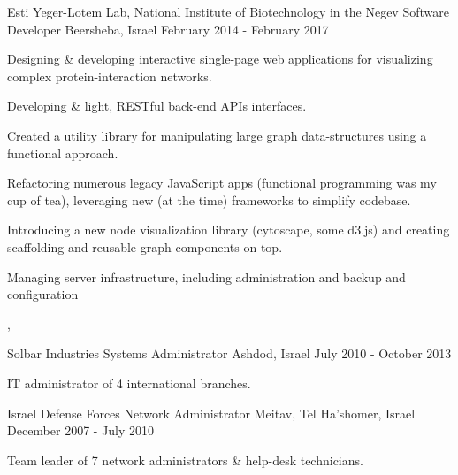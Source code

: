 \begin{cventries}
  \cventry
    {Esti Yeger-Lotem Lab, National Institute of Biotechnology in the Negev}
    {Software Developer}
    {Beersheba, Israel}
    {February 2014 - February 2017}
    {
      \begin{cvitems}
        \item {Designing \& developing interactive single-page web applications for visualizing complex protein-interaction networks.}
        \item {Developing \& light, RESTful back-end APIs interfaces.}
        \item {Created a utility library for manipulating large graph data-structures using a functional approach.}
        \item {Refactoring numerous legacy JavaScript apps (functional programming was my cup of tea), leveraging new (at the time) frameworks to simplify codebase.}
        \item {Introducing a new node visualization library (cytoscape, some d3.js) and creating scaffolding and reusable graph components on top.}
        \item {Managing server infrastructure, including  administration and backup and  configuration}
      \end{cvitems}
    }
    
    \begin{cvskills}
       {, }
       {}
    \end{cvskills}
    
  \cventry
    {Solbar Industries}
    {Systems Administrator}
    {Ashdod, Israel}
    {July 2010 - October 2013}
    {
      \begin{cvitems}
        \item {IT administrator of 4 international branches.}
      \end{cvitems}
    }
    \vspace{3.0mm}

  \cventry
    {Israel Defense Forces}
    {Network Administrator}
    {Meitav, Tel Ha'shomer, Israel}
    {December 2007 - July 2010}
    {
      \begin{cvitems}
        \item {Team leader of 7 network administrators \& help-desk technicians.}
      \end{cvitems}
    }
    \vspace{2.0mm}

\end{cventries}

